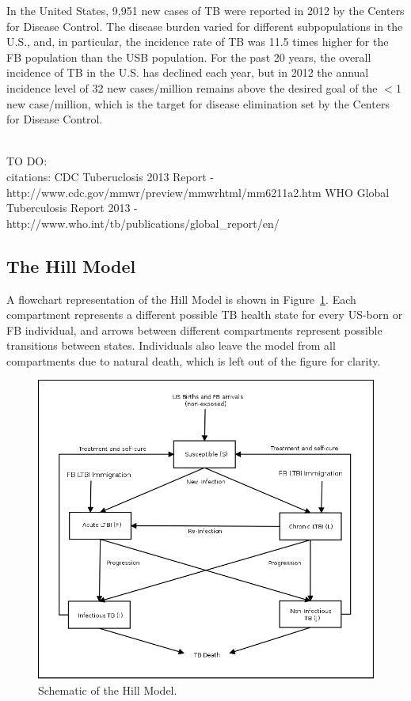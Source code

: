 \documentclass{amsart}
\newcommand{\TODO}[1]{\hfill\\{\huge \color{red} TO DO:} #1 \hfill \\}
\begin{document}
In the United States, 9,951 new cases of TB were reported in 2012 by the Centers
for Disease Control. The disease burden varied for different subpopulations in
the U.S., and, in particular, the incidence rate of TB was 11.5 times higher for
the FB population than the USB population.  For the
past 20 years, the overall incidence of TB in the U.S. has declined each year,
but in 2012 the annual incidence level of 32 new cases/million remains above the
desired goal of the $<$1 new case/million, which is the target for disease
elimination set by the Centers for Disease Control.

\TODO{}citations: CDC Tuberuclosis 2013 Report - http://www.cdc.gov/mmwr/preview/mmwrhtml/mm6211a2.htm
WHO Global Tuberculosis Report 2013 - http://www.who.int/tb/publications/global\_report/en/ 

\subsection{The Hill Model}
A flowchart representation of the Hill Model is shown in
Figure~\ref{fig:hillModelSchematic}. Each compartment represents a different
possible TB health state for every US-born or FB individual, and
arrows between different compartments represent possible transitions between
states. Individuals also leave the model from all compartments due to natural
death, which is left out of the figure for clarity.

\begin{figure}[h]
  \begin{center}
    \includegraphics[scale=0.25]{figures/HillModelFlowChart.png}
  \end{center}
  \caption{Schematic of the Hill Model.}
  \label{fig:hillModelSchematic}
\end{figure}
\end{document}
